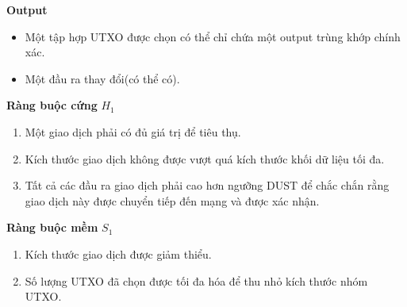 \noindent 
\textbf{Output}
\begin{itemize}
    \item Một tập hợp UTXO được chọn có thể chỉ chứa một output trùng khớp chính xác.
    \item Một đầu ra thay đổi(có thể có). 
\end{itemize}
\textbf{Ràng buộc cứng} $H_1$
\begin{enumerate}
    \item Một giao dịch phải có đủ giá trị để tiêu thụ.
    \item Kích thước giao dịch không được vượt quá kích thước khối dữ liệu tối đa.
    \item Tất cả các đầu ra giao dịch phải cao hơn ngưỡng DUST để chắc chắn rằng giao dịch này được chuyển tiếp đến mạng và được xác nhận.  
\end{enumerate}
\textbf{Ràng buộc mềm} $S_1$
\begin{enumerate}
    \item Kích thước giao dịch được giảm thiểu.
    \item Số lượng UTXO đã chọn được tối đa hóa để thu nhỏ kích thước nhóm UTXO.
\end{enumerate}

\newpage
